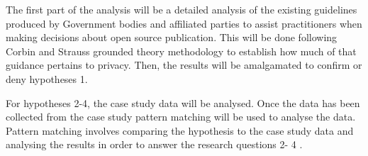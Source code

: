 The first part of the analysis will be a detailed analysis of the existing guidelines produced by Government bodies and affiliated parties to assist practitioners when making decisions about open source publication. This will be done following Corbin and Strauss grounded theory methodology \citep{Corbin_Strauss} to establish how much of that guidance pertains to privacy. Then, the results will be amalgamated to confirm or deny hypotheses 1.

For hypotheses 2-4, the case study data will be analysed. Once the data has been collected from the case study pattern matching will be used to analyse the data. Pattern matching involves comparing the hypothesis to the case study data and analysing the results in order to answer the research questions 2- 4 \citep{Yin_CSMeth2012}. 



